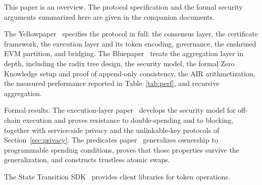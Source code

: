 This paper is an overview. The protocol specification and the formal security arguments summarized here are given in the companion documents.

The Yellowpaper~\cite{yellowpaper} specifies the protocol in full: the consensus layer, the certificate framework, the execution layer and its token encoding, governance, the enshrined EVM partition, and bridging. The Bluepaper~\cite{bluepaper} treats the aggregation layer in depth, including the radix tree design, the security model, the formal Zero Knowledge setup and proof of append-only consistency, the AIR arithmetization, the measured performance reported in Table~\ref{tab:perf}, and recursive aggregation.

Formal results. The execution-layer paper~\cite{exemodel} develops the security model for off-chain execution and proves resistance to double-spending and to blocking, together with service-side privacy and the unlinkable-key protocols of Section~\ref{sec:privacy}. The predicates paper~\cite{predicates} generalizes ownership to programmable spending conditions, proves that those properties survive the generalization, and constructs trustless atomic swaps.

The State Transition SDK~\cite{sdk} provides client libraries for token operations.
